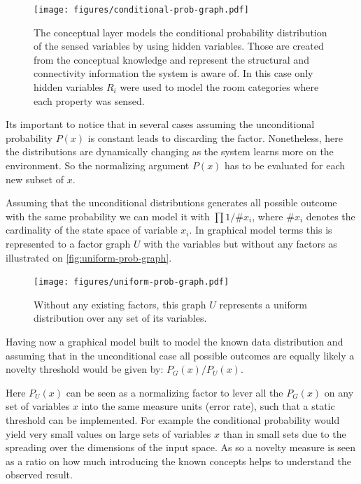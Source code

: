 \documentclass[runningheads,a4paper]{llncs}
\begin{document}
\begin{figure}[h]
\centering
\texttt{[image: figures/conditional-prob-graph.pdf]}
\caption{\label{fig:conditional-prob-graph}The conceptual layer models the conditional
         probability distribution of the sensed variables by using hidden variables.
         Those are created from the conceptual knowledge and represent the structural
         and connectivity information the system is aware of.
         In this case only hidden variables $R_i$ were used to model the room categories
         where each property was sensed.}
\end{figure}


Its important to notice that in several cases assuming the unconditional probability $P(x)$
is constant leads to discarding the factor.
Nonetheless, here the distributions are dynamically changing as the system learns more on the environment.
So the normalizing argument $P(x)$ has to be evaluated for each new subset of $x$.

Assuming that the unconditional distributions generates all possible outcome with the same probability
we can model it with $\prod{1/\# x_i}$, where $\# x_i$ denotes the cardinality of the state space
of variable $x_i$.
In graphical model terms this is represented to a factor graph $U$ with the variables but
without any factors as illustrated on \autoref{fig:uniform-prob-graph}.

\begin{figure}
\centering
\texttt{[image: figures/uniform-prob-graph.pdf]}
\caption{\label{fig:uniform-prob-graph}Without any existing factors, this graph $U$ represents a
         uniform distribution over any set of its variables.}
\end{figure}

Having now a graphical model built to model the known data distribution and assuming that in the unconditional case all
possible outcomes are equally likely a novelty threshold would be given by: $P_G(x)/P_U(x)$.

Here $P_{U}(x)$ can be seen as a normalizing factor to lever all the $P_G(x)$ on any set of
variables $x$ into the same measure units (error rate), such that a static threshold can be implemented.
For example the conditional probability would yield very small values on large sets of variables
$x$ than in small sets due to the spreading over the dimensions of the input space.
As so a novelty measure is seen as a ratio on how much introducing the known concepts helps to
understand the observed result.
\end{document}
